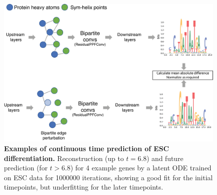 \begin{center}
\begin{figure}[H]
  \includegraphics[width=\linewidth]{./pdnafigs/figS4.png}
    \caption[Examples of continuous time prediction of ESC differentiation.]{\textbf{Examples of continuous time prediction of ESC differentiation.} Reconstruction (up to $t=6.8$) and future prediction (for $t>6.8$) for 4 example genes by a  latent ODE \citep{chen2018neural} trained on ESC data \citep{Klein2015} for 1000000 iterations, showing a good fit for the initial timepoints, but underfitting for the later timepoints.}
  \label{fig:pdnaS4}
\end{figure}
\end{center}

